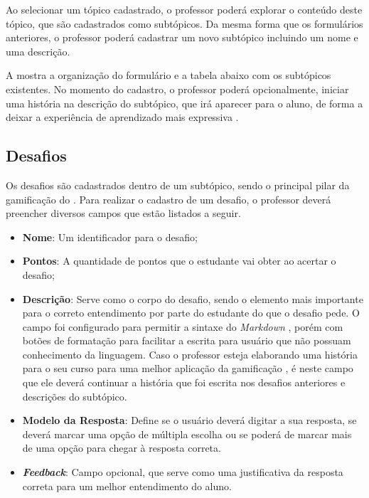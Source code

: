 Ao selecionar um tópico cadastrado, o professor poderá explorar o conteúdo deste tópico, que são cadastrados como subtópicos. Da mesma forma que os formulários anteriores, o professor poderá cadastrar um novo subtópico incluindo um nome e uma descrição.


A  mostra a organização do formulário e a tabela abaixo com os subtópicos existentes. No momento do cadastro, o professor poderá opcionalmente, iniciar uma história na descrição do subtópico, que irá aparecer para o aluno, de forma a deixar a experiência de aprendizado mais expressiva \cite{gamification_motivates}.

\subsection{Desafios}

Os desafios são cadastrados dentro de um subtópico, sendo o principal pilar da gamificação do \appName. Para realizar o cadastro de um desafio, o professor deverá preencher diversos campos que estão listados a seguir.

\begin{itemize}
    \item \textbf{Nome}: Um identificador para o desafio;
    \item \textbf{Pontos}: A quantidade de pontos que o estudante vai obter ao acertar o desafio;
    \item \textbf{Descrição}: Serve como o corpo do desafio, sendo o elemento mais importante para o correto entendimento por parte do estudante do que o desafio pede. O campo foi configurado para permitir a sintaxe do \textit{Markdown} \cite{markdown}, porém com botões de formatação para facilitar a escrita para usuário que não possuam conhecimento da linguagem. Caso o professor esteja elaborando uma história para o seu curso para uma melhor aplicação da gamificação \cite{gamification_motivates}, é neste campo que ele deverá continuar a história que foi escrita nos desafios anteriores e descrições do subtópico.
    \item \textbf{Modelo da Resposta}: Define se o usuário deverá digitar a sua resposta, se deverá marcar uma opção de múltipla escolha ou se poderá de marcar mais de uma opção para chegar à resposta correta.
    \item \textbf{\textit{Feedback}}: Campo opcional, que serve como uma justificativa da resposta correta para um melhor entendimento do aluno.
\end{itemize}

